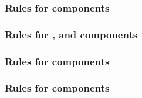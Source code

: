\begin{sbmlenum}
\end{sbmlenum} \subsubsection*{Rules for  components} \begin{sbmlenum}


\end{sbmlenum} \subsubsection*{Rules for ,  and  components} \begin{sbmlenum}


\begin{blockChanged}
\end{blockChanged}

\end{sbmlenum} \subsubsection*{Rules for  components} \begin{sbmlenum}


\end{sbmlenum} \subsubsection*{Rules for  components} \begin{sbmlenum}

\begin{blockChanged}
\end{blockChanged}


\end{sbmlenum}
